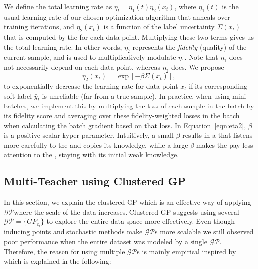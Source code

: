 We define the total learning rate as $\eta_t = \eta_1(t)\eta_2(x_t)$, where $\eta_1(t)$ is the usual learning rate of our chosen optimization algorithm that anneals over training iterations, and $\eta_2(x_t)$ is a function of the label uncertainty $\Sigma(x_t)$ that is computed by the \tch for each data point. Multiplying these two terms gives us the total learning rate. In other words, $\eta_2$ represents the \emph{fidelity} (quality) of the current sample, and is used to multiplicatively modulate $\eta_1$. Note that $\eta_1$ does not necessarily depend on each data point, whereas $\eta_2$ does. We propose
\begin{equation}
 \label{eqn:eta2}
 \eta_2(x_t) = \exp[-\beta \Sigma(x_t)],    
\end{equation}
to exponentially decrease the learning rate for data point $x_t$ if its corresponding soft label $\bar{y}_t$ is unreliable (far from a true sample).
In practice, when using mini-batches, we implement this by multiplying the loss of each sample in the batch by its fidelity score and averaging over these fidelity-weighted losses in the batch when calculating the batch gradient based on that loss. In Equation~\ref{eqn:eta2}, $\beta$ is a positive scalar hyper-parameter. Intuitively, a small $\beta$ results in a \std that listens more carefully to the \tch and copies its knowledge, while a large $\beta$ makes the \std pay less attention to the \tch, staying with its initial weak knowledge. 


\subsection{Multi-Teacher \fwl using Clustered GP}
\label{sec:CGP}
In this section, we explain the clustered GP which is an effective way of applying $\mathcal{GP}$where the scale of the data increases.  Clustered GP suggests using several $\mathcal{GP}=\{GP_{c_i}\}$ to explore the entire data space more effectively. Even though inducing points and stochastic methods make $\mathcal{GP}$s more scalable we still observed poor performance when the entire dataset was modeled by a single $\mathcal{GP}$. Therefore, the reason for using multiple $\mathcal{GP}$s is mainly empirical inspired by~\citep{shen2006fast} which is explained in the following:

